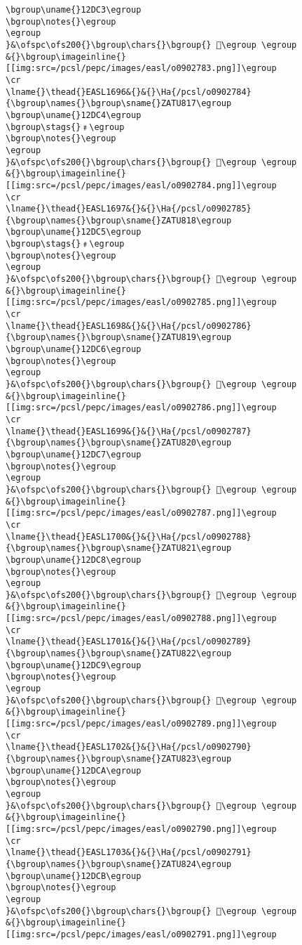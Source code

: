 \begin{verbatim}
\bgroup\uname{}12DC3\egroup
\bgroup\notes{}\egroup
\egroup
}&\ofspc\ofs200{}\bgroup\chars{}\bgroup{} 𒷃\egroup \egroup
&{}\bgroup\imageinline{}[[img:src=/pcsl/pepc/images/easl/o0902783.png]]\egroup
\cr
\lname{}\thead{}EASL1696&{}&{}\Ha{/pcsl/o0902784}{\bgroup\names{}\bgroup\sname{}ZATU817\egroup
\bgroup\uname{}12DC4\egroup
\bgroup\stags{}﹟\egroup
\bgroup\notes{}\egroup
\egroup
}&\ofspc\ofs200{}\bgroup\chars{}\bgroup{} 𒷄\egroup \egroup
&{}\bgroup\imageinline{}[[img:src=/pcsl/pepc/images/easl/o0902784.png]]\egroup
\cr
\lname{}\thead{}EASL1697&{}&{}\Ha{/pcsl/o0902785}{\bgroup\names{}\bgroup\sname{}ZATU818\egroup
\bgroup\uname{}12DC5\egroup
\bgroup\stags{}﹟\egroup
\bgroup\notes{}\egroup
\egroup
}&\ofspc\ofs200{}\bgroup\chars{}\bgroup{} 𒷅\egroup \egroup
&{}\bgroup\imageinline{}[[img:src=/pcsl/pepc/images/easl/o0902785.png]]\egroup
\cr
\lname{}\thead{}EASL1698&{}&{}\Ha{/pcsl/o0902786}{\bgroup\names{}\bgroup\sname{}ZATU819\egroup
\bgroup\uname{}12DC6\egroup
\bgroup\notes{}\egroup
\egroup
}&\ofspc\ofs200{}\bgroup\chars{}\bgroup{} 𒷆\egroup \egroup
&{}\bgroup\imageinline{}[[img:src=/pcsl/pepc/images/easl/o0902786.png]]\egroup
\cr
\lname{}\thead{}EASL1699&{}&{}\Ha{/pcsl/o0902787}{\bgroup\names{}\bgroup\sname{}ZATU820\egroup
\bgroup\uname{}12DC7\egroup
\bgroup\notes{}\egroup
\egroup
}&\ofspc\ofs200{}\bgroup\chars{}\bgroup{} 𒷇\egroup \egroup
&{}\bgroup\imageinline{}[[img:src=/pcsl/pepc/images/easl/o0902787.png]]\egroup
\cr
\lname{}\thead{}EASL1700&{}&{}\Ha{/pcsl/o0902788}{\bgroup\names{}\bgroup\sname{}ZATU821\egroup
\bgroup\uname{}12DC8\egroup
\bgroup\notes{}\egroup
\egroup
}&\ofspc\ofs200{}\bgroup\chars{}\bgroup{} 𒷈\egroup \egroup
&{}\bgroup\imageinline{}[[img:src=/pcsl/pepc/images/easl/o0902788.png]]\egroup
\cr
\lname{}\thead{}EASL1701&{}&{}\Ha{/pcsl/o0902789}{\bgroup\names{}\bgroup\sname{}ZATU822\egroup
\bgroup\uname{}12DC9\egroup
\bgroup\notes{}\egroup
\egroup
}&\ofspc\ofs200{}\bgroup\chars{}\bgroup{} 𒷉\egroup \egroup
&{}\bgroup\imageinline{}[[img:src=/pcsl/pepc/images/easl/o0902789.png]]\egroup
\cr
\lname{}\thead{}EASL1702&{}&{}\Ha{/pcsl/o0902790}{\bgroup\names{}\bgroup\sname{}ZATU823\egroup
\bgroup\uname{}12DCA\egroup
\bgroup\notes{}\egroup
\egroup
}&\ofspc\ofs200{}\bgroup\chars{}\bgroup{} 𒷊\egroup \egroup
&{}\bgroup\imageinline{}[[img:src=/pcsl/pepc/images/easl/o0902790.png]]\egroup
\cr
\lname{}\thead{}EASL1703&{}&{}\Ha{/pcsl/o0902791}{\bgroup\names{}\bgroup\sname{}ZATU824\egroup
\bgroup\uname{}12DCB\egroup
\bgroup\notes{}\egroup
\egroup
}&\ofspc\ofs200{}\bgroup\chars{}\bgroup{} 𒷋\egroup \egroup
&{}\bgroup\imageinline{}[[img:src=/pcsl/pepc/images/easl/o0902791.png]]\egroup

\end{verbatim}
